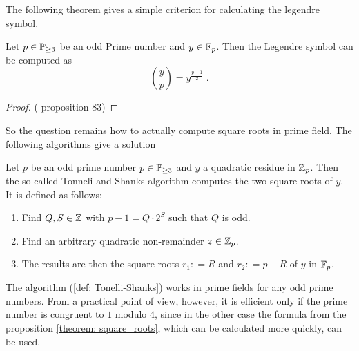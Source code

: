 The following theorem  gives a simple criterion for calculating the legendre symbol.
\begin{theorem}  Let $ p \in \mathbb{P}_{\geq 3} $ be an odd 
Prime number and $ y \in \mathbb{F}_p $. Then the Legendre symbol can be computed as 
\begin{equation}
\label{eq: Euler_criterium}
\left (\frac{y}{p} \right) = y^{\frac{p-1}{2}} \;.
\end{equation}
\end{theorem}
\begin{proof} (\cite{HW} proposition 83) 
\end{proof}
So the question remains how to actually compute square roots in prime field. The following algorithms give a solution
\begin{definition}
\label{def: Tonelli-Shanks}
Let $ p $ be an odd prime number $ p \in \mathbb{P} _{\geq 3} $ and $ y $ a quadratic residue in $ \mathbb{Z}_p $. Then the so-called Tonneli \cite{TA} and Shanks \cite{SD} algorithm computes the two square roots of $ y $. It is defined as follows:
\begin{enumerate}
\item Find $ Q, S \in \mathbb{Z} $ with $ p-1 = Q \cdot 2 ^ S $ such that $ Q $ is odd.
\item Find an arbitrary quadratic non-remainder $ z \in \mathbb{Z}_p $.
\item
The results are then the square roots $ r_1: = R $ and $ r_2: = p-R $ of $y$ in $\mathbb{F}_p$.
\end{enumerate}
\end{definition}


\begin{remark}
The algorithm (\ref{def: Tonelli-Shanks}) works in prime fields for any odd prime numbers. From a practical point of view, however, it is efficient only if the prime number is congruent to $ 1 $ modulo $ 4 $, since in the other case the formula from the proposition \ref{theorem: square_roots}, which can be calculated more quickly, can be used.
\end{remark}

